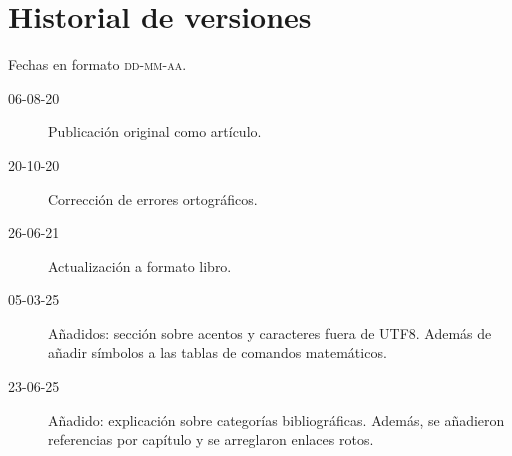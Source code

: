 \documentclass[intro-breve-latex.tex]{subfiles}
\begin{document}
\section*{Historial de versiones}
Fechas en formato \textsc{dd-mm-aa}. 
\begin{description}
	\item[06-08-20] Publicación original como artículo.
	\item[20-10-20] Corrección de errores ortográficos.
	\item[26-06-21] Actualización a formato libro.
	\item[05-03-25] Añadidos: sección sobre acentos y caracteres fuera de UTF8.
		Además de añadir símbolos a las tablas de comandos matemáticos.
	\item[23-06-25] Añadido: explicación sobre categorías bibliográficas.
		Además, se añadieron referencias por capítulo y se arreglaron enlaces rotos.
\end{description}
\end{document}
